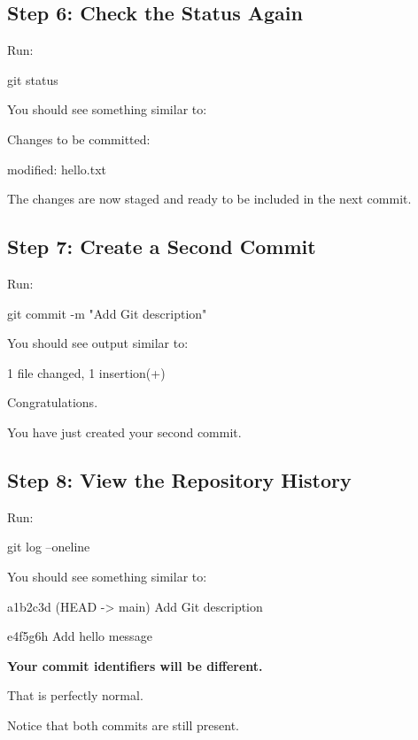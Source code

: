 \documentclass{csc2059practical}
\begin{document}
\subsection{Step 6: Check the Status Again}
Run:

\begin{terminalplain}
git status
\end{terminalplain}
You should see something similar to:

\begin{terminalplain}
Changes to be committed:

\hspace{1cm}\textcolor{GitGreen}{modified: hello.txt}
\end{terminalplain}
The changes are now staged and ready to be included in the next commit.

\subsection{Step 7: Create a Second Commit}
Run:

\begin{terminalplain}
git commit -m "Add Git description"
\end{terminalplain}
You should see output similar to:

\begin{terminalplain}
1 file changed, 1 insertion(+)
\end{terminalplain}
Congratulations.

You have just created your second commit.

\subsection{Step 8: View the Repository History}
Run:

\begin{terminalplain}
git log --oneline
\end{terminalplain}
You should see something similar to:

\begin{terminalplain}
a1b2c3d (HEAD -> main) Add Git description

e4f5g6h Add hello message
\end{terminalplain}

\textbf{Your commit identifiers will be different.}

That is perfectly normal.

Notice that both commits are still present.
\end{document}
